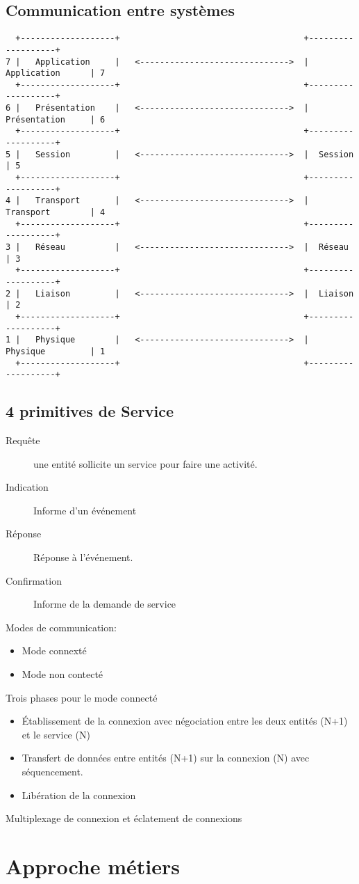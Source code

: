 \documentclass[12pt,a4paper,openany]{book}
\begin{document}
\section{Communication entre systèmes}
\begin{verbatim}
  +-------------------+                                     +-------------------+
7 |   Application     |   <------------------------------>  |  Application      | 7
  +-------------------+                                     +-------------------+
6 |   Présentation    |   <------------------------------>  |  Présentation     | 6 
  +-------------------+                                     +-------------------+
5 |   Session         |   <------------------------------>  |  Session          | 5 
  +-------------------+                                     +-------------------+
4 |   Transport       |   <------------------------------>  |  Transport        | 4
  +-------------------+                                     +-------------------+
3 |   Réseau          |   <------------------------------>  |  Réseau           | 3
  +-------------------+                                     +-------------------+ 
2 |   Liaison         |   <------------------------------>  |  Liaison          | 2
  +-------------------+                                     +-------------------+
1 |   Physique        |   <------------------------------>  |  Physique         | 1
  +-------------------+                                     +-------------------+

\end{verbatim}

\section{4 primitives de Service} 
\begin{description}
	\item[Requête] une entité sollicite un service pour faire une activité.
	\item[Indication] Informe d'un événement
	\item[Réponse] Réponse à l'événement.
	\item[Confirmation] Informe de la demande de service
\end{description}
Modes de communication:
\begin{itemize}
	\item Mode connexté
	\item Mode non contecté
\end{itemize}

Trois phases pour le mode connecté
\begin{itemize}
	\item \'Etablissement de la connexion avec négociation entre les deux entités (N+1) et le service (N)
	\item Transfert de données entre entités (N+1) sur la connexion (N) avec séquencement.
	\item Libération de la connexion
\end{itemize}
Multiplexage de connexion et éclatement de connexions
	\chapter{Approche métiers}
\end{document}
